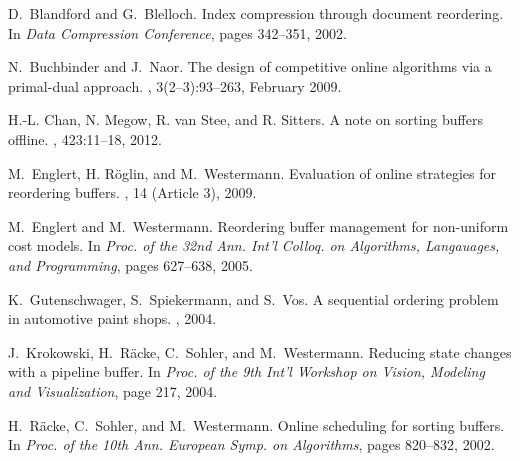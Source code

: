 \documentclass[12pt]{article}
\begin{document}
\begin{thebibliography}{10}
D.~Blandford and G.~Blelloch.
\newblock Index compression through document reordering.
\newblock In {\em Data Compression Conference}, pages 342--351, 2002.

N.~Buchbinder and J.~Naor. 
\newblock The design of competitive online algorithms via a primal-dual 
approach. 
,  3(2--3):93--263, February 2009.

H.-L. Chan, N. Megow, R. van Stee, and R. Sitters.
\newblock A note on sorting buffers offline.
, 423:11--18, 2012.



M.~Englert, H. R{\"o}glin, and M.~Westermann.
\newblock Evaluation of online strategies for reordering buffers.
, 14 (Article 3), 2009.

M.~Englert and M.~Westermann.
\newblock Reordering buffer management for non-uniform cost models.
\newblock In {\em Proc. of the 32nd Ann. Int'l Colloq. on
  Algorithms, Langauages, and Programming}, pages 627--638, 2005.



K.~Gutenschwager, S.~Spiekermann, and S.~Vos.
\newblock A sequential ordering problem in automotive paint shops.
,
  2004.



J.~Krokowski, H.~R{\"a}cke, C.~Sohler, and M.~Westermann.
\newblock Reducing state changes with a pipeline buffer.
\newblock In {\em Proc. of the 9th Int'l Workshop on Vision, Modeling and Visualization},
  page 217, 2004.



H.~R\"{a}cke, C.~Sohler, and M.~Westermann.
\newblock Online scheduling for sorting buffers.
\newblock In {\em Proc. of the 10th Ann. European Symp. on Algorithms},
  pages 820--832, 2002.



\end{thebibliography}
\end{document}
